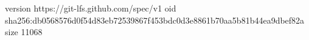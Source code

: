 version https://git-lfs.github.com/spec/v1
oid sha256:db0568576d0f54d83eb72539867f453bdc0d3e8861b70aa5b81b44ea9dbef82a
size 11068
